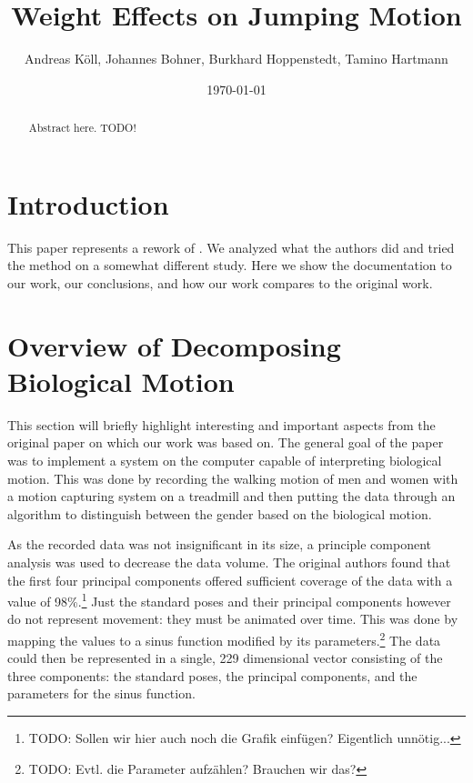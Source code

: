 \documentclass[a4paper]{article}
\begin{document}
\title{Weight Effects on Jumping Motion}
\author{Andreas Köll, Johannes Bohner, Burkhard Hoppenstedt, Tamino Hartmann}
\date{\today}

\maketitle

\begin{abstract}
Abstract here. TODO!
\end{abstract}
\newpage

\section{Introduction}

This paper represents a rework of \cite{origin}.
We analyzed what the authors did and tried the method on a somewhat different study.
Here we show the documentation to our work, our conclusions, and how our work compares to the original work.

\section{Overview of Decomposing Biological Motion}

This section will briefly highlight interesting and important aspects from the original paper on which our work was based on.
The general goal of the paper was to implement a system on the computer capable of interpreting biological motion.
This was done by recording the walking motion of men and women with a motion capturing system on a treadmill and then putting the data through an algorithm to distinguish between the gender based on the biological motion.

As the recorded data was not insignificant in its size, a principle component analysis was used to decrease the data volume.
The original authors found that the first four principal components offered sufficient coverage of the data with a value of 98\%.\footnote{TODO: Sollen wir hier auch noch die Grafik einfügen? Eigentlich unnötig...}
Just the standard poses and their principal components however do not represent movement: they must be animated over time.
This was done by mapping the values to a sinus function modified by its parameters.\footnote{TODO: Evtl. die Parameter aufzählen? Brauchen wir das?}
The data could then be represented in a single, 229 dimensional vector consisting of the three components: the standard poses, the principal components, and the parameters for the sinus function.
\end{document}
